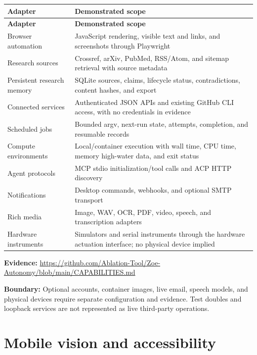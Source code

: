 \documentclass[11pt]{article}
\newcommand{\boundary}[1]{\par\smallskip\small\color{ZoeGray}\textbf{Boundary:} #1\normalsize\par\smallskip}
\newcommand{\evidence}[1]{\par\smallskip\small\color{ZoeGray}\textbf{Evidence:} #1\normalsize\par\smallskip}
\begin{document}
\begin{longtable}{p{}p{}}
\toprule
\textbf{Adapter} & \textbf{Demonstrated scope}\\
\midrule
\endfirsthead
\toprule
\textbf{Adapter} & \textbf{Demonstrated scope}\\
\midrule
\endhead
Browser automation & JavaScript rendering, visible text and links, and screenshots through Playwright\\
Research sources & Crossref, arXiv, PubMed, RSS/Atom, and sitemap retrieval with source metadata\\
Persistent research memory & SQLite sources, claims, lifecycle status, contradictions, content hashes, and export\\
Connected services & Authenticated JSON APIs and existing GitHub CLI access, with no credentials in evidence\\
Scheduled jobs & Bounded argv, next-run state, attempts, completion, and resumable records\\
Compute environments & Local/container execution with wall time, CPU time, memory high-water data, and exit status\\
Agent protocols & MCP stdio initialization/tool calls and ACP HTTP discovery\\
Notifications & Desktop commands, webhooks, and optional SMTP transport\\
Rich media & Image, WAV, OCR, PDF, video, speech, and transcription adapters\\
Hardware instruments & Simulators and serial instruments through the hardware actuation interface; no physical device implied\\
\bottomrule
\end{longtable}

\evidence{\url{https://github.com/Ablation-Tool/Zoe-Autonomy/blob/main/CAPABILITIES.md}}
\boundary{Optional accounts, container images, live email, speech models, and physical devices require separate configuration and evidence. Test doubles and loopback services are not represented as live third-party operations.}

\clearpage
\section{Mobile vision and accessibility}
\end{document}
